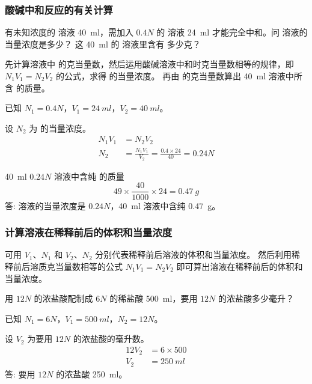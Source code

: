 \subsubsection{酸碱中和反应的有关计算}
\begin{example}
有未知浓度的  溶液 \qty{40}{ml}，需加入 $0.4N$ 的  溶液 \qty{24}{ml} 才能完全中和。问  溶液的当量浓度是多少？ 这 \qty{40}{ml} 的  溶液里含有  多少克？
\end{example}

\begin{analyze}
先计算溶液中  的克当量数，然后运用酸碱溶液中和时克当量数相等的规律，即 $N_1V_1=N_2V_2$ 的公式，求得  的当量浓度。
再由  的克当量数算出 \qty{40}{ml}  溶液中所含  的质量。
\end{analyze}

\begin{solution}
  已知 $N_1=0.4N$，$V_1=\qty{24}{ml}$，$V_2=\qty{40}{ml}$。

  设 $N_2$ 为  的当量浓度。
  \begin{align*} 
    N_1V_1&=N_2V_2\\ 
    N_2&=\frac{N_1V_1}{V_2}=\frac{0.4\times24}{40}=0.24N
  \end{align*}

  \qty{40}{ml} $0.24N$  溶液中含纯  的质量
  \[ 49\times\frac{40}{1000}\times 24=\qty{0.47}{g} \]
  答:  溶液的当量浓度是 $0.24N$，\qty{40}{ml}  溶液中含纯  \qty{0.47}{g}。
\end{solution}

\subsubsection{计算溶液在稀释前后的体积和当量浓度}
可用 $V_1$、$N_1$ 和 $V_2$、$N_2$ 分别代表稀释前后溶液的体积和当量浓度。
然后利用稀释前后溶质克当量数相等的公式 $N_1V_1=N_2V_2$ 即可算出溶液在稀释前后的体积和当量浓度。

\begin{example}
  用 $12N$ 的浓盐酸配制成 $6N$ 的稀盐酸 \qty{500}{ml}，要用 $12N$ 的浓盐酸多少毫升？
\end{example}
\begin{solution}
  已知 $N_1=6N$，$V_1=\qty{500}{ml}$，$N_2=12N$。

  设 $V_2$ 为要用 $12N$ 的浓盐酸的毫升数。
  \begin{align*} 
    12V_2&=6\times 500\\ 
    V_2&=\qty{250}{ml}
  \end{align*}
  答: 要用 $12N$ 的浓盐酸 \qty{250}{ml}。
\end{solution}

